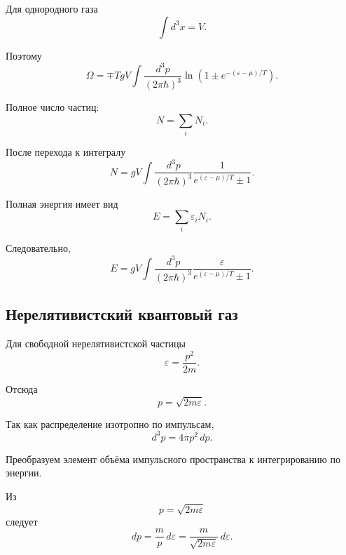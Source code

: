 \documentclass[../final.tex]{subfiles}
\begin{document}
Для однородного газа
%
\begin{equation*}
    \int d^3x
    =
    V.
\end{equation*}

Поэтому
%
\[
    \boxed{
        \Omega
        =
        \mp
        TgV
        \int
        \frac{d^3p}{(2\pi\hbar)^3}
        \ln
        \left(
            1
            \pm
            e^{-(\varepsilon-\mu)/T}
        \right)
    }.
\]

Полное число частиц:
%
\begin{equation*}
    N
    =
    \sum_i
    N_i.
\end{equation*}

После перехода к интегралу
%
\[
    \boxed{
        N
        =
        gV
        \int
        \frac{d^3p}{(2\pi\hbar)^3}
        \frac{1}{
            e^{(\varepsilon-\mu)/T}\pm1
        }
    }.
\]

Полная энергия имеет вид
%
\begin{equation*}
    E
    =
    \sum_i
    \varepsilon_iN_i.
\end{equation*}

Следовательно,
%
\[
    \boxed{
        E
        =
        gV
        \int
        \frac{d^3p}{(2\pi\hbar)^3}
        \frac{\varepsilon}{
            e^{(\varepsilon-\mu)/T}\pm1
        }
    }.
\]


\subsection{Нерелятивистский квантовый газ}

Для свободной нерелятивистской частицы
%
\begin{equation*}
    \varepsilon
    =
    \frac{p^2}{2m}.
\end{equation*}

Отсюда
%
\begin{equation*}
    p
    =
    \sqrt{2m\varepsilon}.
\end{equation*}

Так как распределение изотропно по импульсам,
%
\begin{equation*}
    d^3p
    =
    4\pi p^2\,dp.
\end{equation*}

Преобразуем элемент объёма импульсного пространства
к интегрированию по энергии.

Из
%
\begin{equation*}
    p
    =
    \sqrt{2m\varepsilon}
\end{equation*}
%
следует
%
\begin{equation*}
    dp
    =
    \frac{m}{p}\,d\varepsilon
    =
    \frac{m}{
        \sqrt{2m\varepsilon}
    }
    \,d\varepsilon.
\end{equation*}
\end{document}
